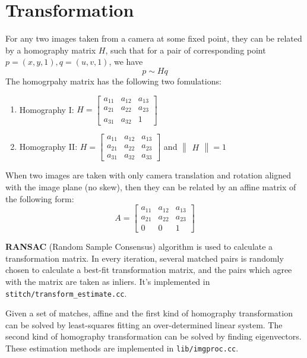 
\section{Transformation}
\label{sec:transform}

For any two images taken from a camera at some fixed point,
they can be related by a homography matrix $H$,
such that for a pair of corresponding point $ p=(x,y,1), q = (u,v,1)$,
we have
\[ p \sim Hq\]
The homogrpahy matrix has the following two fomulations:
\begin{enumerate}
  \item Homography I: $H = \begin{bmatrix} a_{11} &a_{12} & a_{13}\\ a_{21} & a_{22} & a_{23}\\ a_{31} & a_{32} & 1\end{bmatrix}$

  \item Homography II:
    $H = \begin{bmatrix} a_{11} &a_{12} & a_{13}\\ a_{21} & a_{22} & a_{23}\\ a_{31} & a_{32} & a_{33}\end{bmatrix} $
    and $\begin{Vmatrix} H \end{Vmatrix} = 1$
\end{enumerate}

When two images are taken with only camera translation
and rotation aligned with the image plane (no skew),
then they can be related by an affine matrix of the following form:
\[ A = \begin{bmatrix} a_{11} &a_{12} & a_{13}\\ a_{21} & a_{22} & a_{23}\\ 0 & 0 & 1\end{bmatrix} \]


\textbf{RANSAC} (Random Sample Consensus) algorithm\cite{ransac} is used to calculate a transformation matrix.
In every iteration, several matched pairs is randomly chosen to calculate a best-fit transformation matrix,
and the pairs which agree with the matrix are taken as inliers. It's implemented in \verb|stitch/transform_estimate.cc|.

Given a set of matches, affine and the first kind of homography transformation can be solved
by least-squares fitting an over-determined linear system.
The second kind of homography transformation can be solved by finding eigenvectors.
These estimation methods are implemented in \verb|lib/imgproc.cc|.

